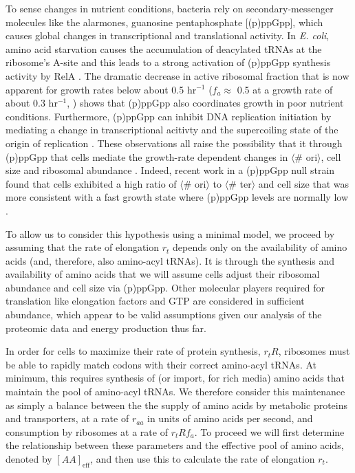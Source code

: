 To sense changes in nutrient conditions, bacteria rely on secondary-messenger
molecules like the alarmones, guanosine pentaphosphate [(p)ppGpp], which causes
global changes in transcriptional and translational activity.  In \textit{E.
coli}, amino acid starvation causes the accumulation of deacylated tRNAs at the
ribosome's A-site and this leads to a strong activation of (p)ppGpp synthesis
activity by RelA \citep{hauryliuk2015}.  The dramatic decrease in active
ribosomal fraction that is now apparent for growth rates below about 0.5
hr$^{-1}$ ($f_a \approx$ 0.5 at a growth rate of about 0.3 hr$^{-1}$,
\cite{dai2016}) shows that (p)ppGpp also coordinates growth in poor nutrient
conditions. Furthermore, (p)ppGpp can inhibit DNA replication initiation by
mediating a change in transcriptional acitivty and the supercoiling state of the
origin of replication \citep{kraemer2019}. These observations all raise the
possibility that it through (p)ppGpp that cells mediate the growth-rate dependent
changes in $\langle$\# ori$\rangle$, cell size and
ribosomal abundance \citep{zhu2019, Buke2020}. Indeed, recent work in a (p)ppGpp null
strain found that cells exhibited a high ratio of $\langle$\# ori$\rangle$ to
$\langle$\# ter$\rangle$ and cell size that was more consistent with a fast
growth state where (p)ppGpp levels are normally low \citep{fernandezcoll2020}.

To allow us to consider this hypothesis using a minimal model, we proceed by
assuming that the rate of elongation $r_t$ depends only on the availability of
amino acids (and, therefore, also amino-acyl tRNAs). It is through the synthesis
and availability of amino acids that we will assume cells adjust their ribosomal
abundance and cell size via (p)ppGpp. Other molecular players required for translation
like elongation factors and GTP are considered in sufficient abundance, which appear
to be valid assumptions given our analysis of the proteomic data and energy
production thus far.


In order for cells to maximize their rate of protein synthesis, $r_t R$,
ribosomes must be able to rapidly match codons with their correct amino-acyl
tRNAs. At minimum, this requires synthesis of (or import, for rich media) amino
acids that maintain the pool of amino-acyl tRNAs. We therefore consider this
maintenance as simply a balance between the the supply of amino acids by
metabolic proteins and transporters, at a rate of $r_{aa}$ in units of amino
acids per second, and consumption by ribosomes at a rate of $r_t R f_a$.
To proceed we will first determine the
relationship between these parameters and the effective pool of amino acids,
denoted by $[AA]_{\text{eff}}$, and then use this to calculate the rate of
elongation $r_t$.





